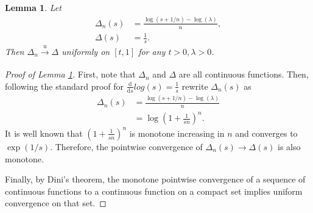 \documentclass[a4paper]{article}
\newtheorem{lemma}{Lemma}
\begin{document}
\begin{lemma}
    \label{lemma:log_convergence}
    Let 
    \begin{align*}
        \Delta_n(s) &= \frac{\log(s + 1/n) - \log(\lambda)}{n}, \\
        \Delta(s) &= \frac{1}{s}.
    \end{align*}
    Then $\Delta_n \xrightarrow[]{\mathrm{u}} \Delta$ uniformly on $[t, 1]$ for any $t > 0, \lambda > 0$.
\end{lemma}
\begin{proof}[Proof of Lemma \ref{lemma:log_convergence}]
    First, note that $\Delta_n$ and $\Delta$ are all continuous functions. Then, following the standard proof for $\frac{\mathrm{d}}{\mathrm{d}s}log(s) = \frac{1}{s}$ rewrite $\Delta_n(s)$ as
    \begin{align*}
        \Delta_n(s) &= \frac{\log(s + 1/n) - \log(\lambda)}{n} \\
        &= \log \left( 1 + \frac{1}{sn} \right) ^ n .
    \end{align*}
    It is well known that $\left( 1 + \frac{1}{sn} \right) ^ n$ is monotone increasing in $n$ and converges to $\exp (1/s)$. Therefore, the pointwise convergence of $\Delta_n(s) \to \Delta(s)$ is also monotone.

    Finally, by Dini's theorem, the monotone pointwise convergence of a sequence of continuous functions to a continuous function on a compact set implies uniform convergence on that set.
\end{proof}
\end{document}
